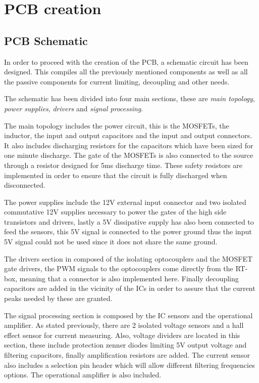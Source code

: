 \section{PCB creation}
\subsection{PCB Schematic} \label{PCB_Schematic}
In order to proceed with the creation of the PCB, a schematic circuit has been designed. This compiles all the previously mentioned components as well as all the passive components for current limiting, decoupling and other needs.

The schematic has been divided into four main sections, these are \textit{main topology}, \textit{power supplies}, \textit{drivers} and \textit{signal processing}.

The main topology includes the power circuit, this is the MOSFETs, the inductor, the input and output capacitors and the input and output connectors. It also includes discharging resistors for the capacitors which have been sized for one minute discharge. The gate of the MOSFETs is also connected to the source through a resistor designed for 5ms discharge time. These safety resistors are implemented in order to ensure that the circuit is fully discharged when disconnected. 

The power supplies include the 12V external input connector and two isolated commutative 12V supplies necessary to power the gates of the high side transistors and drivers, lastly a 5V dissipative supply has also been connected to feed the sensors, this 5V signal is connected to the power ground thus the input 5V signal could not be used since it does not share the same ground.

The drivers section in composed of the isolating optocouplers and the MOSFET gate drivers, the PWM signals to the optocouplers come directly from the RT-box, meaning that a connector is also implemented here. Finally decoupling capacitors are added in the vicinity of the ICs  in order to assure that the current peaks needed by these are granted. 

The signal processing section is composed by the IC sensors and the operational amplifier. As stated previously, there are 2 isolated voltage sensors and a hall effect sensor for current measuring. Also, voltage dividers are located in this section, these include protection zenner diodes limiting 5V output voltage and filtering capacitors, finally amplification resistors are added. The current sensor also includes a selection pin header which will allow different filtering frequencies options. The operational amplifier is also included. 

